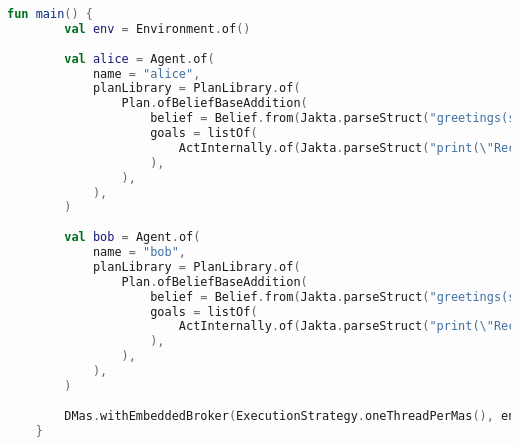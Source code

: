 \begin{lstlisting}[caption={Usage example: \texttt{Broadcast}: Receiver's code.}, label={lst:Broadcast}, language=Kotlin]
    fun main() {
        val env = Environment.of()
    
        val alice = Agent.of(
            name = "alice",
            planLibrary = PlanLibrary.of(
                Plan.ofBeliefBaseAddition(
                    belief = Belief.from(Jakta.parseStruct("greetings(source(Sender))")),
                    goals = listOf(
                        ActInternally.of(Jakta.parseStruct("print(\"Received message from: \", Sender)")),
                    ),
                ),
            ),
        )
    
        val bob = Agent.of(
            name = "bob",
            planLibrary = PlanLibrary.of(
                Plan.ofBeliefBaseAddition(
                    belief = Belief.from(Jakta.parseStruct("greetings(source(Sender))")),
                    goals = listOf(
                        ActInternally.of(Jakta.parseStruct("print(\"Received message from: \", Sender)")),
                    ),
                ),
            ),
        )
    
        DMas.withEmbeddedBroker(ExecutionStrategy.oneThreadPerMas(), env, listOf(alice, bob), emptyList()).start()
    }

\end{lstlisting}